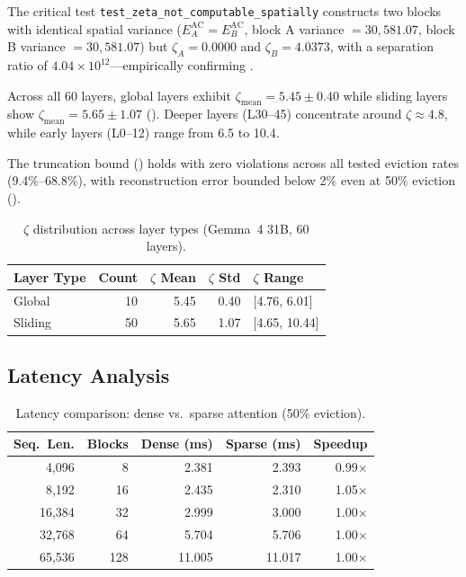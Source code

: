 \documentclass[conference,10pt]{IEEEtran}
\begin{document}
The critical test \texttt{test\_zeta\_not\_computable\_spatially} constructs
two blocks with identical spatial variance ($E_A^{\text{AC}} = E_B^{\text{AC}}$,
block A variance $= 30{,}581.07$, block B variance $= 30{,}581.07$) but
$\zeta_A = 0.0000$ and $\zeta_B = 4.0373$, with a separation ratio of
$4.04 \times 10^{12}$---empirically confirming .

Across all 60 layers, global layers exhibit $\zeta_{\text{mean}} = 5.45 \pm 0.40$
while sliding layers show $\zeta_{\text{mean}} = 5.65 \pm 1.07$
(). Deeper layers (L30--45) concentrate around
$\zeta \approx 4.8$, while early layers (L0--12) range from 6.5 to 10.4.

The truncation bound () holds with zero violations across all
tested eviction rates (9.4\%--68.8\%), with reconstruction error bounded
below 2\% even at 50\% eviction ().

\begin{table}[t]
    \centering
    \caption{$\zeta$ distribution across layer types (Gemma~4 31B, 60 layers).}
    \label{tab:zeta_dist}
    \begin{tabular}{@{}lrrrl@{}}
        \toprule
        \textbf{Layer Type} & \textbf{Count} & \textbf{$\zeta$ Mean} & \textbf{$\zeta$ Std} & \textbf{$\zeta$ Range} \\
        \midrule
        Global  & 10 & 5.45 & 0.40 & [4.76, 6.01] \\
        Sliding & 50 & 5.65 & 1.07 & [4.65, 10.44] \\
        \bottomrule
    \end{tabular}
\end{table}

\subsection{Latency Analysis}

\begin{table}[t]
    \centering
    \caption{Latency comparison: dense vs.\ sparse attention (50\% eviction).}
    \label{tab:latency}
    \begin{tabular}{@{}rrrrr@{}}
        \toprule
        \textbf{Seq.\ Len.} & \textbf{Blocks} & \textbf{Dense (ms)} & \textbf{Sparse (ms)} & \textbf{Speedup} \\
        \midrule
        4{,}096  & 8   & 2.381 & 2.393 & 0.99$\times$ \\
        8{,}192  & 16  & 2.435 & 2.310 & 1.05$\times$ \\
        16{,}384 & 32  & 2.999 & 3.000 & 1.00$\times$ \\
        32{,}768 & 64  & 5.704 & 5.706 & 1.00$\times$ \\
        65{,}536 & 128 & 11.005 & 11.017 & 1.00$\times$ \\
        \bottomrule
    \end{tabular}
\end{table}
\end{document}
